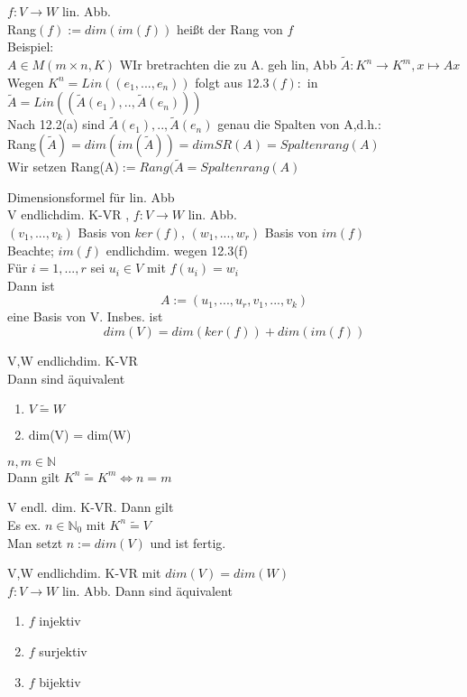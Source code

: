 \documentclass[headsepline,12pt,a4paper]{scrartcl}
\makeatletter
\def\myItem{%
   \@ifnextchar[ \@myItem{\@noitemargtrue\@myItem[\@itemlabel]}}
\def\@myItem[#1]{\item[#1]\mbox{}\\}
\makeatother
\begin{document}
\myItem[12.11] $f: V \rightarrow W$ lin. Abb. \\
Rang$(f):=dim(im(f))$ heißt der Rang von $f$ \\

Beispiel: \\
$A \in M(m\times n,K)$
WIr bretrachten die zu A. geh lin, Abb $\tilde{A}: K^n \rightarrow K^m, x \mapsto Ax$ \\
Wegen $K^n=Lin((e_1,...,e_n))$ folgt aus $12.3(f):$ in $\tilde{A}= Lin((\tilde{A}(e_1),..,\tilde{A}(e_n)))$ \\
Nach 12.2(a) sind $\tilde{A}(e_1),..,\tilde{A}(e_n)$ genau die Spalten von A,d.h.: \\
Rang$(\tilde{A})=dim(im(\tilde{A})) = dim SR(A) = Spaltenrang (A) $\\

Wir setzen Rang(A)$:= Rang(\tilde{A}=Spaltenrang(A)$ \\

\newpage 

\myItem[Satz 12.13] Dimensionsformel für lin. Abb \\ 

V endlichdim. K-VR , $f: V \rightarrow W$ lin. Abb. \\

$(v_1 ,..., v_k)$ Basis von $ker(f)$, $(w_1,...,w_r)$ Basis von $im(f)$ \\
Beachte; $im(f)$ endlichdim. wegen 12.3(f) \\
Für $i=1,...,r$ sei $u_i\in V$ mit $f(u_i)=w_i$ \\
Dann ist $$ A:=(u_1,...,u_r,v_1,...,v_k) $$ 
eine Basis von V. Insbes. ist \\
$$ dim(V)=dim(ker(f))+dim(im(f)) $$ 

\myItem[12.14]

V,W endlichdim. K-VR  \\
Dann sind äquivalent \\
\begin{enumerate}
\item $V \tilde{=} W$ \\
\item dim(V) = dim(W) \\
\end{enumerate}

\myItem[Folgerung 12.15]  $n,m \in \mathbb{N}$  \\
Dann gilt $K^n \tilde{=} K^m \Leftrightarrow n=m$ 

\myItem[Folgerung 12.16] V endl. dim. K-VR. Dann gilt \\
Es ex. $n \in \mathbb{N}_{0}$ mit $K^n \tilde{=} V$ \\

Man setzt $n:= dim(V)$ und ist fertig. 

\myItem[Folgerung 12.17] V,W endlichdim. K-VR mit $dim(V)=dim(W)$\\
$f: V \rightarrow W$ lin. Abb. Dann sind äquivalent \\

\begin{enumerate}
\item $f$ injektiv \\
\item $f$ surjektiv \\
\item $f$ bijektiv
\end{enumerate}
\end{document}
